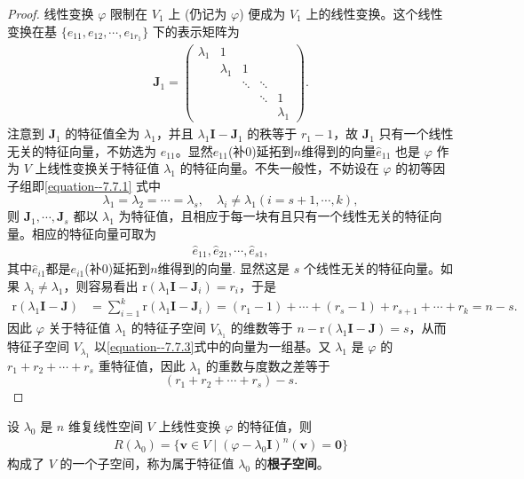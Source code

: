 \documentclass[../../main.tex]{subfiles}%
\begin{document}
\begin{proof}
线性变换 $\varphi$ 限制在 $V_1$ 上 (仍记为 $\varphi$) 便成为 $V_1$ 上的线性变换。这个线性变换在基 $\{e_{11}, e_{12}, \cdots, e_{1r_1}\}$ 下的表示矩阵为
\begin{align*}
\boldsymbol{J}_1 = 
\begin{pmatrix}
\lambda_1 & 1 & & & \\
& \lambda_1 & 1 & & \\
& & \ddots & \ddots & \\
& & & \ddots & 1 \\
& & & & \lambda_1
\end{pmatrix}.
\end{align*}
注意到 $\boldsymbol{J}_1$ 的特征值全为 $\lambda_1$，并且 $\lambda_1\boldsymbol{I} - \boldsymbol{J}_1$ 的秩等于 $r_1 - 1$，故 $\boldsymbol{J}_1$ 只有一个线性无关的特征向量，不妨选为 $e_{11}$。显然$e_{11}$(补0)延拓到$n$维得到的向量$\hat{e}_{11}$ 也是 $\varphi$ 作为 $V$ 上线性变换关于特征值 $\lambda_1$ 的特征向量。不失一般性，不妨设在 $\varphi$ 的初等因子组即\eqref{equation--7.7.1} 式中
\[
\lambda_1 = \lambda_2 = \cdots = \lambda_s, \quad \lambda_i \neq \lambda_1 (i = s + 1, \cdots, k),
\]
则 $\boldsymbol{J}_1, \cdots, \boldsymbol{J}_s$ 都以 $\lambda_1$ 为特征值，且{\heiti 相应于每一块有且只有一个线性无关的特征向量}。相应的特征向量可取为
\begin{align}
\hat{e}_{11}, \hat{e}_{21}, \cdots, \hat{e}_{s1}, \label{equation--7.7.3}
\end{align}
其中$\hat{e}_{i1}$都是$e_{i1}$(补0)延拓到$n$维得到的向量.
显然这是 $s$ 个线性无关的特征向量。如果 $\lambda_i \neq \lambda_1$，则容易看出 $\mathrm{r}(\lambda_1\boldsymbol{I} - \boldsymbol{J}_i) = r_i$，于是
\begin{align*}
\mathrm{r}(\lambda_1\boldsymbol{I} - \boldsymbol{J}) &= \sum_{i = 1}^{k} \mathrm{r}(\lambda_1\boldsymbol{I} - \boldsymbol{J}_i) = (r_1 - 1) + \cdots + (r_s - 1) + r_{s + 1} + \cdots + r_k = n - s.
\end{align*}
因此 $\varphi$ 关于特征值 $\lambda_1$ 的特征子空间 $V_{\lambda_1}$ 的维数等于 $n - \mathrm{r}(\lambda_1\boldsymbol{I} - \boldsymbol{J}) = s$，从而特征子空间 $V_{\lambda_1}$ 以\eqref{equation--7.7.3}式中的向量为一组基。又 $\lambda_1$ 是 $\varphi$ 的 $r_1 + r_2 + \cdots + r_s$ 重特征值，因此 $\lambda_1$ 的重数与度数之差等于
\[
(r_1 + r_2 + \cdots + r_s) - s.
\]
\end{proof}

\begin{definition}[根子空间]
设 $\lambda_0$ 是 $n$ 维复线性空间 $V$ 上线性变换 $\varphi$ 的特征值，则
\begin{align*}
R(\lambda_0) = \{\boldsymbol{v} \in V \mid (\varphi - \lambda_0\boldsymbol{I})^n(\boldsymbol{v}) = \boldsymbol{0}\}
\end{align*}
构成了 $V$ 的一个子空间，称为属于特征值 $\lambda_0$ 的\textbf{根子空间}。 
\end{definition}
\end{document}
